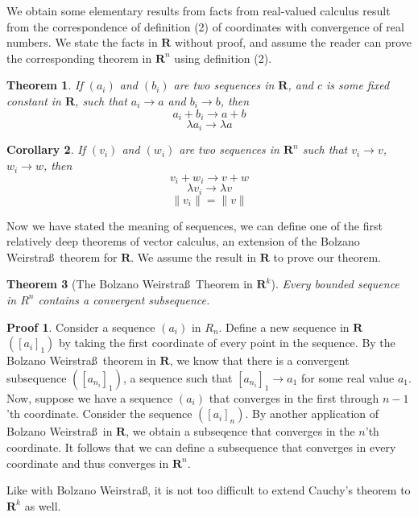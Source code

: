 \documentclass[12pt]{amsbook}
\theoremstyle{plain}
\newtheorem{theorem}{Theorem}
\newtheorem{corollary}[theorem]{Corollary}
\theoremstyle{definition}
\newtheorem*{prf}{Proof}
\begin{document}
We obtain some elementary results from facts from real-valued calculus result from the correspondence of definition (2) of coordinates with convergence of real numbers. We state the facts in $\mathbf{R}$ without proof, and assume the reader can prove the corresponding theorem in $\mathbf{R}^n$ using definition (2).

\begin{theorem}
  If $(a_i)$ and $(b_i)$ are two sequences in $\mathbf{R}$, and $c$ is some fixed constant in $\mathbf{R}$, such that $a_i \to a$ and $ b_i \to b$, then
  \[ a_i + b_i \to a + b \]
  \[ \lambda a_i \to \lambda a \]
\end{theorem}

\begin{corollary}
  If $(v_i)$ and $(w_i)$ are two sequences in $\mathbf{R}^n$ such that $v_i \to v$, $w_i \to w$, then
  \[v_i + w_i \to v + w\]
  \[ \lambda v_i \to \lambda v \]
  \[ \| v_i \| = \| v \| \]
\end{corollary}

Now we have stated the meaning of sequences, we can define one of the first relatively deep theorems of vector calculus, an extension of the Bolzano Weirstra\ss\ theorem for $\mathbf{R}$. We assume the result in $\mathbf{R}$ to prove our theorem.

\begin{theorem}[The Bolzano Weirstra\ss\ Theorem in $\mathbf{R}^k$]
  Every bounded sequence in $R^n$ contains a convergent subsequence.
\end{theorem}
\begin{prf}
  Consider a sequence $(a_i)$ in $R_n$. Define a new sequence in $\mathbf{R}$ $([a_i]_1)$ by taking the first coordinate of every point in the sequence. By the Bolzano Weirstra\ss\ theorem in $\mathbf{R}$, we know that there is a convergent subsequence $([a_{n_i}]_1)$, a sequence such that $[a_{n_i}]_1 \to a_1$ for some real value $a_1$. Now, suppose we have a sequence $(a_i)$ that converges in the first through $n-1$'th coordinate. Consider the sequence $([a_i]_n)$. By another application of Bolzano Weirstra\ss\ in $\mathbf{R}$, we obtain a subseqence that converges in the $n$'th coordinate. It follows that we can define a subsequence that converges in every coordinate and thus converges in $\mathbf{R}^n$.
\end{prf}

Like with Bolzano Weirstra\ss, it is not too difficult to extend Cauchy's theorem to $\mathbf{R}^k$ as well.
\end{document}

